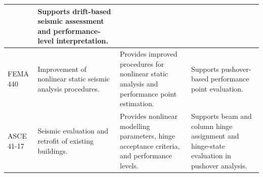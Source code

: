 \begin{longtable}{@{}p{3.25cm}p{3.30cm}p{3.35cm}p{2.90cm}@{}}
& Supports drift-based seismic assessment and performance-level interpretation. \\ \hline
FEMA 440 \cite{fema2005fema440}
& Improvement of nonlinear static seismic analysis procedures.
& Provides improved procedures for nonlinear static analysis and performance point estimation.
& Supports pushover-based performance point evaluation. \\ \hline
ASCE 41-17 \cite{asce2017asce41}
& Seismic evaluation and retrofit of existing buildings.
& Provides nonlinear modelling parameters, hinge acceptance criteria, and performance levels.
& Supports beam and column hinge assignment and hinge-state evaluation in pushover analysis. \\ \hline\hline
\end{longtable}
\endgroup
\begingroup
\small
\setlength{\tabcolsep}{3pt}
\setlength{\LTpre}{6pt}
\setlength{\LTpost}{6pt}
